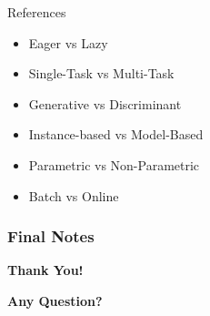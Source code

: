 \documentclass[compress,oilve]{beamer}
\begin{document}
\begin{frame}{References}
\begin{itemize}
\item Eager vs Lazy
\item Single-Task vs Multi-Task
\item Generative vs Discriminant
\item Instance-based vs Model-Based
\item Parametric vs Non-Parametric
\item Batch vs Online
\end{itemize}
\end{frame}

\frametitle{Final Notes}
\centering
\vspace{50 pt}
\textbf{Thank You!}
\vspace{50pt}

\textbf{Any Question?}
\end{document}
